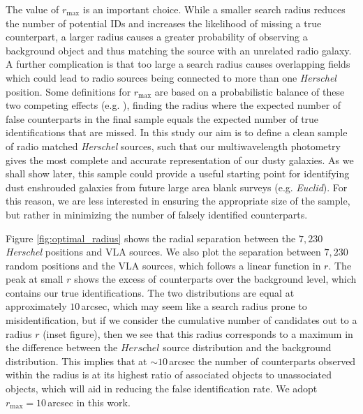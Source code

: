The value of $r_{\textrm{max}}$ is an important choice. While a smaller search radius reduces the number of potential IDs and increases the likelihood of missing a true counterpart, a larger radius causes a greater probability of observing a background object and thus matching the source with an unrelated radio galaxy. A further complication is that too large a search radius causes overlapping fields which could lead to radio sources being connected to more than one \textit{Herschel} position. Some definitions for $r_{\textrm{max}}$ are based on a probabilistic balance of these two competing effects (e.g. \citealt{Dye_2009}), finding the radius where the expected number of false counterparts in the final sample equals the expected number of true identifications that are missed. In this study our aim is to define a clean sample of radio matched \textit{Herschel} sources, such that our multiwavelength photometry gives the most complete and accurate representation of our dusty galaxies. As we shall show later, this sample could provide a useful starting point for identifying dust enshrouded galaxies from future large area blank surveys (e.g. \textit{Euclid}). For this reason, we are less interested in ensuring the appropriate size of the sample, but rather in minimizing the number of falsely identified counterparts.

Figure \ref{fig:optimal_radius} shows the radial separation between the $7,230$ \textit{Herschel} positions and VLA sources. We also plot the separation between $7,230$ random positions and the VLA sources, which follows a linear function in $r$. The peak at small $r$ shows the excess of counterparts over the background level, which contains our true identifications. The two distributions are equal at approximately $10\,$arcsec, which may seem like a search radius prone to misidentification, but if we consider the cumulative number of candidates out to a radius $r$ (inset figure), then we see that this radius corresponds to a maximum in the difference between the $\textit{Herschel}$ source distribution and the background distribution. This implies that at $\sim 10\,$arcsec the number of counterparts observed within the radius is at its highest ratio of associated objects to unassociated objects, which will aid in reducing the false identification rate. We adopt $r_{\textrm{max}} = 10\,$arcsec in this work.

